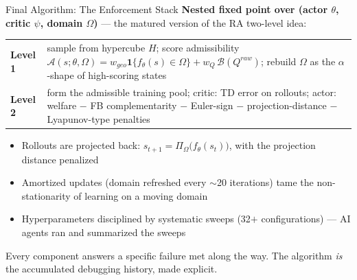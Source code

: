 \documentclass[10pt,aspectratio=169]{beamer}
\newcommand{\compacttables}{\renewcommand{\arraystretch}{1.15}}
\begin{document}
\begin{frame}[label=mainFinalAlgo]{Final Algorithm: The Enforcement Stack}
\textbf{Nested fixed point over (actor $\theta$, critic $\psi$, domain $\Omega$)} --- the matured version of the RA two-level idea:

\smallskip
\compacttables
\begin{center}\footnotesize
\renewcommand{\arraystretch}{1.0}
\begin{tabular}{p{2.0cm}p{9.9cm}}
\toprule
\textbf{Level 1} & sample from hypercube $H$; score admissibility
$\mathcal{A}(s;\theta,\Omega) = w_{geo}\mathbf{1}\{f_\theta(s)\in\Omega\} + w_Q\,\mathcal{B}(Q^{raw})$;
rebuild $\Omega$ as the $\alpha$-shape of high-scoring states \\
\textbf{Level 2} & form the admissible training pool; critic: TD error on rollouts;
actor: welfare $-$ FB complementarity $-$ Euler-sign $-$ projection-distance
$-$ Lyapunov-type penalties \\
\bottomrule
\end{tabular}
\end{center}

\smallskip
\begin{itemize}\small
    \item Rollouts are projected back: $s_{t+1} = \Pi_\Omega\big(f_\theta(s_t)\big)$, with the
          projection distance penalized
    \item Amortized updates (domain refreshed every $\sim$20 iterations) tame the
          non-stationarity of learning on a moving domain
    \item Hyperparameters disciplined by systematic sweeps (32$+$ configurations) ---
          AI agents ran and summarized the sweeps
\end{itemize}

\smallskip
\begin{block}{}
\small Every component answers a specific failure met along the way. The algorithm \emph{is}
the accumulated debugging history, made explicit.
\end{block}
\vspace{0.2em}\hfill
\hyperlink{appFB}{}\hspace{0.3em}%
\hyperlink{appDomain}{}\hspace{0.3em}%
\hyperlink{appLyap}{}\hspace{0.3em}%
\hyperlink{appStack}{}
\end{frame}
\end{document}

